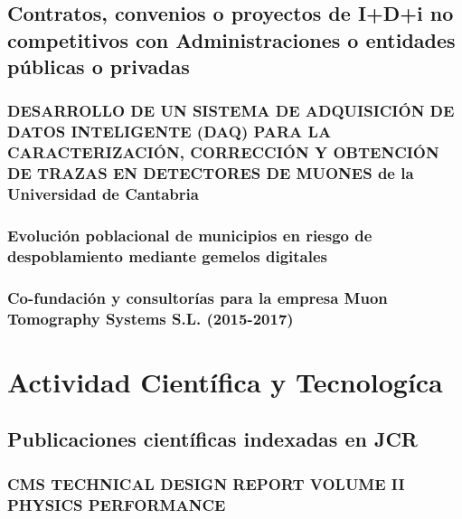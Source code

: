\documentclass[a4paper, 11pt, twoside, openright]{report}
\begin{document}
\section{Contratos, convenios o proyectos de I+D+i no competitivos con Administraciones o entidades públicas o privadas}

\subsection{DESARROLLO DE UN SISTEMA DE ADQUISICIÓN DE DATOS INTELIGENTE (DAQ) PARA LA CARACTERIZACIÓN, CORRECCIÓN Y OBTENCIÓN DE TRAZAS EN DETECTORES DE MUONES de la Universidad de Cantabria}


\subsection{Evolución poblacional de municipios en riesgo de despoblamiento mediante gemelos digitales}


\subsection{Co-fundación y consultorías para la empresa Muon Tomography Systems S.L. (2015-2017)}



\chapter{Actividad Científica y Tecnologíca}

\section{Publicaciones científicas indexadas en JCR}

\subsection{CMS TECHNICAL DESIGN REPORT VOLUME II PHYSICS PERFORMANCE}

\end{document}
